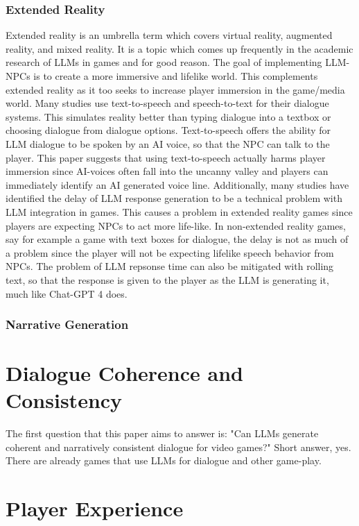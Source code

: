 \documentclass[10pt,twocolumn]{article}
\begin{document}
\subsubsection{Extended Reality}
Extended reality is an umbrella term which covers virtual reality, augmented reality, and mixed reality. It is a topic which comes up frequently in the academic research of LLMs in games and for good reason. The goal of implementing LLM-NPCs is to create a more immersive and lifelike world. This complements extended reality as it too seeks to increase player immersion in the game/media world. Many studies use text-to-speech and speech-to-text for their dialogue systems. This simulates reality better than typing dialogue into a textbox or choosing dialogue from dialogue options. Text-to-speech offers the ability for LLM dialogue to be spoken by an AI voice, so that the NPC can talk to the player. This paper suggests that using text-to-speech actually harms player immersion since AI-voices often fall into the uncanny valley and players can immediately identify an AI generated voice line. Additionally, many studies have identified the delay of LLM response generation to be a technical problem with LLM integration in games. This causes a problem in extended reality games since players are expecting NPCs to act more life-like. In non-extended reality games, say for example a game with text boxes for dialogue, the delay is not as much of a problem since the player will not be expecting lifelike speech behavior from NPCs. The problem of LLM repsonse time can also be mitigated with rolling text, so that the response is given to the player as the LLM is generating it, much like Chat-GPT 4 does.

\subsubsection{Narrative Generation}

\section{Dialogue Coherence and Consistency}

The first question that this paper aims to answer is: "Can LLMs generate coherent and narratively consistent dialogue for video games?" Short answer, yes. There are already games that use LLMs for dialogue and other game-play.

\section{Player Experience}
\end{document}
